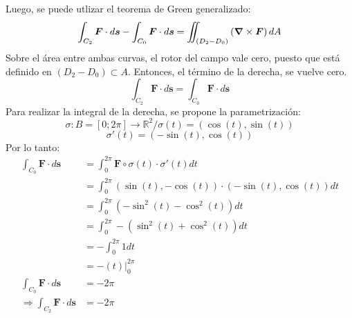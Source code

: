 \begin{solution}
\begin{center}
\begin{tikzpicture}
        \end{tikzpicture}
    \end{center}
    Luego, se puede utlizar el teorema de Green generalizado:
    \begin{equation*}
        \int_{C_2}\boldsymbol{F}\cdot d\boldsymbol{s} - \int_{C_0}\boldsymbol{F}\cdot d\boldsymbol{s} = \iint_{\left(D_2-D_0\right)}\left(\grad \times \boldsymbol{F}\right)dA
    \end{equation*}
    Sobre el área entre ambas curvas, el rotor del campo vale cero, puesto que está definido en $\left(D_2-D_0\right)\subset A$. Entonces, el término de la derecha, se vuelve cero.
    \begin{equation*}
        \int_{C_2}\boldsymbol{F}\cdot d\boldsymbol{s} = \int_{C_0}\boldsymbol{F}\cdot d\boldsymbol{s}
    \end{equation*}
    Para realizar la integral de la derecha, se propone la parametrización:
    \begin{equation*}
        \sigma: B=[0;2\pi] \longrightarrow \mathbb{R}^2 / \sigma(t) = (\cos(t),\sin(t))
    \end{equation*}
    \begin{equation*}
        \sigma'(t)=(-\sin(t),\cos(t))
    \end{equation*}
    Por lo tanto:
    \begin{align*}
        \int_{C_0}\boldsymbol{F}\cdot d\boldsymbol{s}&=\int_{0}^{2\pi}\boldsymbol{F}\circ\sigma(t) \cdot \sigma'(t) dt\\
        &=\int_{0}^{2\pi} (\sin(t),-\cos(t)) \cdot (-\sin(t),\cos(t)) dt\\
        &=\int_{0}^{2\pi} \left(-\sin^2(t)-\cos^2(t)\right) dt\\
        &=\int_{0}^{2\pi} -\left(\sin^2(t)+\cos^2(t)\right) dt\\
        &=-\int_{0}^{2\pi} 1 dt\\
        &=-\left.\left(t\right)\right|_{0}^{2\pi}\\
        \int_{C_0}\boldsymbol{F}\cdot d\boldsymbol{s}&=-2\pi\\
        \Rightarrow \int_{C_2}\boldsymbol{F}\cdot d\boldsymbol{s}&=-2\pi
    \end{align*}
\end{solution}


